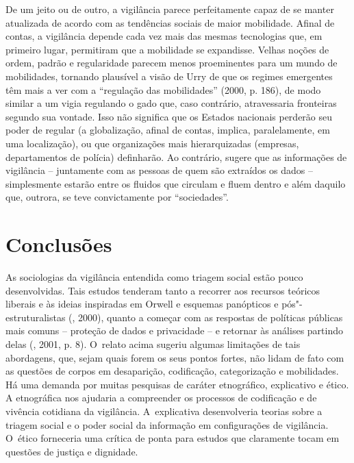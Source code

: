 De um jeito ou de outro, a vigilância parece perfeitamente capaz de se
manter atualizada de acordo com as tendências sociais de maior
mobilidade. Afinal de contas, a vigilância depende cada vez mais das
mesmas tecnologias que, em primeiro lugar, permitiram que a mobilidade
se expandisse. Velhas noções de ordem, padrão e regularidade parecem
menos proeminentes para um mundo de mobilidades, tornando plausível a
visão de Urry de que os regimes emergentes têm mais a ver com a
``regulação das mobilidades'' (2000, p. 186), de modo similar a um vigia
regulando o gado que, caso contrário, atravessaria fronteiras segundo
sua vontade. Isso não significa que os Estados nacionais perderão seu
poder de regular (a globalização, afinal de contas, implica,
paralelamente, em uma localização), ou que organizações mais
hierarquizadas (empresas, departamentos de polícia) definharão. Ao
contrário, sugere que as informações de vigilância -- juntamente com as
pessoas de quem são extraídos os dados -- simplesmente estarão entre os
fluidos que circulam e fluem dentro e além daquilo que, outrora, se teve
convictamente por ``sociedades''.

\section{Conclusões}

As sociologias da vigilância entendida como triagem social estão pouco
desenvolvidas. Tais estudos tenderam tanto a recorrer aos recursos
teóricos liberais e às ideias inspiradas em Orwell e esquemas panópticos
e pós"-estruturalistas (, 2000), quanto a começar com as respostas
de políticas públicas mais comuns -- proteção de dados e privacidade --
e retornar às análises partindo delas (, 2001, p. 8). O~relato
acima sugeriu algumas limitações de tais abordagens, que, sejam quais
forem os seus pontos fortes, não lidam de fato com as questões de corpos
em desaparição, codificação, categorização e mobilidades. Há uma demanda
por muitas pesquisas de caráter etnográfico, explicativo e ético. A
etnográfica nos ajudaria a compreender os processos de codificação e de
vivência cotidiana da vigilância. A~explicativa desenvolveria teorias
sobre a triagem social e o poder social da informação em configurações
de vigilância. O~ético forneceria uma crítica de ponta para estudos que
claramente tocam em questões de justiça e dignidade.

